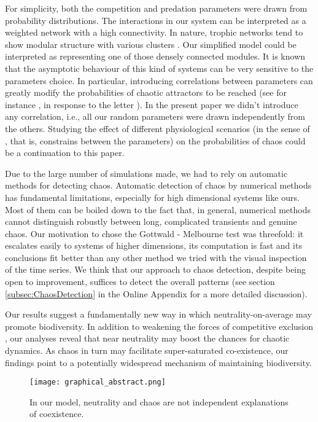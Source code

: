 For simplicity, both the competition and predation parameters were drawn from probability distributions. The interactions in our system can be interpreted as a weighted network with a high connectivity. In nature, trophic networks tend to show modular structure with various clusters \citep{Thebault2010}. Our simplified model could be interpreted as representing one of those densely connected modules. It is known that the asymptotic behaviour of this kind of systems can be very sensitive to the parameters choice. In particular, introducing correlations between parameters can greatly modify the probabilities of chaotic attractors to be reached (see for instance \citet{Huisman2001}, in response to the letter \citet{Schippers2001}). In the present paper we didn't introduce any correlation, i.e., all our random parameters were drawn independently from the others. Studying the effect of different physiological scenarios (in the sense of \citet{Huisman2001}, that is, constrains between the parameters) on the probabilities of chaos could be a continuation to this paper.

Due to the large number of simulations made, we had to rely on automatic methods for detecting chaos. Automatic detection of chaos by numerical methods has fundamental limitations, especially for high dimensional systems like ours. Most of them can be boiled down to the fact that, in general, numerical methods cannot distinguish robustly between long, complicated transients and genuine chaos. Our motivation to chose the Gottwald - Melbourne test \citep{Gottwald2009} was threefold: it escalates easily to systems of higher dimensions, its computation is fast and its conclusions fit better than any other method we tried with the visual inspection of the time series. We think that our approach to chaos detection, despite being open to improvement, suffices to detect the overall patterns (see section \ref{subsec:ChaosDetection} in the Online Appendix for a more detailed discussion).

Our results suggest a fundamentally new way in which neutrality-on-average may promote biodiversity. In addition to weakening the forces of competitive exclusion \citep{Scheffer2018}, our analyses reveal that near neutrality may boost the chances for chaotic dynamics. As chaos in turn may facilitate super-saturated co-existence, our findings point to a potentially widespread mechanism of maintaining biodiversity.

\begin{figure}
	\begin{center}
		\texttt{[image: graphical\_abstract.png]}
	\end{center}
	\caption{In our model, neutrality and chaos are not independent explanations of coexistence.}
	\label{fig:GapInKnowledge}
\end{figure}
